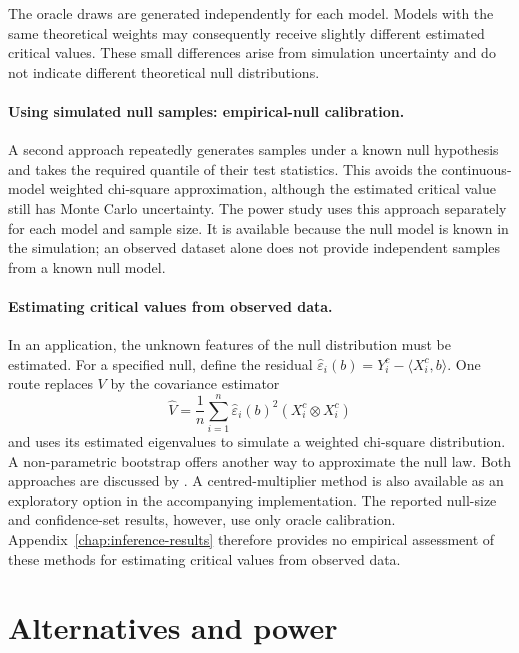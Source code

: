The oracle draws are generated independently for each model.  Models with
the same theoretical weights may consequently receive slightly different
estimated critical values.  These small differences arise from simulation
uncertainty and do not indicate different theoretical null distributions.

\paragraph{Using simulated null samples: empirical-null calibration.}
A second approach repeatedly generates samples under a known null
hypothesis and takes the required quantile of their test statistics.
This avoids the continuous-model weighted chi-square approximation,
although the estimated critical value still has Monte Carlo uncertainty.
The power study uses this approach separately for each model and sample
size.  It is available because the null model is known in the simulation;
an observed dataset alone does not provide independent samples from a known
null model.

\paragraph{Estimating critical values from observed data.}
In an application, the unknown features of the null distribution must be
estimated.  For a specified null, define the residual
$\widehat\varepsilon_i(b)=Y_i^c-\langle X_i^c,b\rangle$.  One route replaces
$V$ by the covariance estimator
\begin{equation}
    \widehat V
    =\frac1n\sum_{i=1}^{n}
      \widehat\varepsilon_i(b)^2
      (X_i^c\otimes X_i^c)
    \label{eq:inference-plugin-variance}
\end{equation}
and uses its estimated eigenvalues to simulate a weighted chi-square
distribution.  A non-parametric bootstrap offers another way to approximate
the null law.  Both approaches are discussed by
\textcite{babii_carrasco_tsafack_2026}.  A centred-multiplier method is also
available as an exploratory option in the accompanying implementation.
The reported null-size and confidence-set results, however, use only oracle
calibration.  Appendix~\ref{chap:inference-results} therefore provides no
empirical assessment of these methods for estimating critical values from
observed data.

\section{Alternatives and power}
\label{sec:inference-power}

